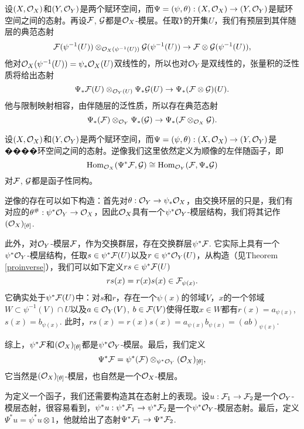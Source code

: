 \begin{para}[张量积的顺像]
设$(X,\mathcal{O}_X)$和$(Y,\mathcal{O}_Y)$是两个赋环空间，而$\Psi=(\psi,\theta):(X,\mathcal{O}_X)\to (Y,\mathcal{O}_Y)$是赋环空间之间的态射。再设$\mathcal{F}$, $\mathcal{G}$都是$\mathcal{O}_X$-模层。任取$Y$的开集$U$，我们有预层到其伴随层的典范态射
\[
	\mathcal{F}(\psi^{-1}(U))\otimes_{\mathcal{O}_X(\psi^{-1}(U))} \mathcal{G}(\psi^{-1}(U))\to \mathcal{F}\otimes \mathcal{G}(\psi^{-1}(U)),
\]
他对$\mathcal{O}_X(\psi^{-1}(U))=\psi_*\mathcal{O}_X(U)$双线性的，所以也对$\mathcal{O}_Y$是双线性的，张量积的泛性质将给出态射
\[
	\Psi_*\mathcal{F} (U)\otimes_{\mathcal{O}_Y(U)}\Psi_*\mathcal{G} (U)\to \Psi_*(\mathcal{F}\otimes \mathcal{G}) (U).
\]
他与限制映射相容，由伴随层的泛性质，所以存在典范态射
\[
	\Psi_*(\mathcal{F})\otimes_{\mathcal{O}_Y}\Psi_*(\mathcal{G}) \to \Psi_*(\mathcal{F}\otimes_{\mathcal{O}_X} \mathcal{G}).
\]
\end{para}

\begin{para}[逆像]
设$(X,\mathcal{O}_X)$和$(Y,\mathcal{O}_Y)$是两个赋环空间，而$\Psi=(\psi,\theta):(X,\mathcal{O}_X)\to (Y,\mathcal{O}_Y)$是����环空间之间的态射。逆像我们这里依然定义为顺像的左伴随函子，即
\[
	\operatorname{Hom}_{\mathcal{O}_X}(\Psi^*\mathcal{F},\mathcal{G})\cong \operatorname{Hom}_{\mathcal{O}_Y}(\mathcal{F},\Psi_*\mathcal{G})
\]
对$\mathcal{F}$, $\mathcal{G}$都是函子性同构。

逆像的存在可以如下构造：首先对$\theta:\mathcal{O}_Y\to \psi_*\mathcal{O}_X$，由交换环层的只是，我们有对应的$\theta^\#:\psi^*\mathcal{O}_Y\to \mathcal{O}_X$，因此$\mathcal{O}_X$具有一个$\psi^*\mathcal{O}_Y$-模层结构，我们将其记作$(\mathcal{O}_X)_{[\theta]}$.

此外，对$\mathcal{O}_Y$-模层$\mathcal{F}$，作为交换群层，存在交换群层$\psi^*\mathcal{F}$. 它实际上具有一个$\psi^*\mathcal{O}_Y$-模层结构，任取$s\in \psi^*\mathcal{F}(U)$以及$r\in \psi^*\mathcal{O}_Y(U)$，从构造（见Theorem \ref{proinverse}），我们可以如下定义$rs\in \psi^*\mathcal{F}(U)$
\[
	rs(x)=r(x)s(x)\in \mathcal{F}_{\psi(x)}.
\]
它确实处于$\psi^*\mathcal{F}(U)$中：对$s$和$r$，存在一个$\psi(x)$的邻域$V$，$x$的一个邻域$W\subset \psi^{-1}(V)\cap U$以及$a\in \mathcal{O}_Y(V)$, $b\in \mathcal{F}(V)$使得任取$x\in W$都有$r(x)=a_{\psi(x)}$, $s(x)=b_{\psi(x)}$. 此时，$rs(x)=r(x)s(x)=a_{\psi(x)}b_{\psi(x)}=(ab)_{\psi(x)}$.

综上，$\psi^*\mathcal{F}$和$(\mathcal{O}_X)_{[\theta]}$都是$\psi^*\mathcal{O}_Y$-模层。最后，我们定义
\[
	\Psi^*\mathcal{F}=\psi^*(\mathcal{F})\otimes_{\psi^*\mathcal{O}_Y} (\mathcal{O}_X)_{[\theta]},
\]
它当然是$(\mathcal{O}_X)_{[\theta]}$-模层，也自然是一个$\mathcal{O}_X$-模层。

为定义一个函子，我们还需要构造其在态射上的表现。设$u:\mathcal{F}_1\to\mathcal{F}_2$是一个$\mathcal{O}_Y$-模层态射，很容易看到，$\psi^*u :\psi^*\mathcal{F}_1\to\psi^*\mathcal{F}_2$是一个$\psi^*\mathcal{O}_Y$-模层态射。最后，定义$\Psi^*u=\psi^*u\otimes 1$，他就给出了态射$\Psi^*\mathcal{F}_1\to \Psi^*\mathcal{F}_2$.
\end{para}


